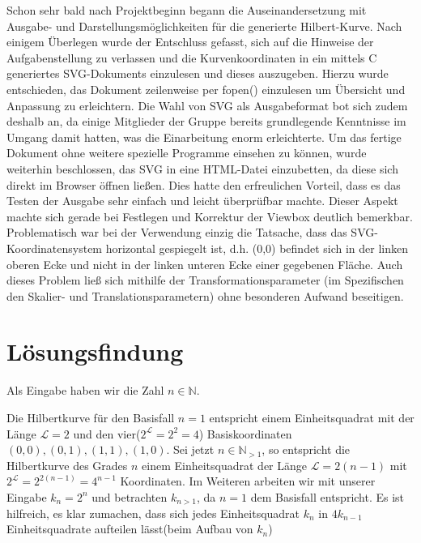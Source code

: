 \documentclass[course=erap]{aspdoc}
\begin{document}
Schon sehr bald nach Projektbeginn begann die Auseinandersetzung mit Ausgabe-
und Darstellungsmöglichkeiten für die generierte Hilbert-Kurve.
Nach einigem Überlegen wurde der Entschluss gefasst, sich auf die Hinweise der
Aufgabenstellung zu verlassen und die Kurvenkoordinaten in ein mittels C
generiertes SVG-Dokuments einzulesen und dieses auszugeben. Hierzu wurde
entschieden, das Dokument zeilenweise per fopen() einzulesen um Übersicht und
Anpassung zu erleichtern.
\newline
\newline
Die Wahl von SVG als Ausgabeformat bot sich zudem deshalb an, da einige
Mitglieder der Gruppe bereits grundlegende Kenntnisse im Umgang damit hatten,
was die Einarbeitung enorm erleichterte.
\newline
\newline
Um das fertige Dokument ohne weitere spezielle Programme einsehen zu können,
wurde weiterhin beschlossen, das SVG in eine HTML-Datei einzubetten, da diese
sich direkt im Browser öffnen ließen. 
Dies hatte den erfreulichen Vorteil, dass es das Testen der Ausgabe sehr
einfach und leicht überprüfbar machte. Dieser Aspekt machte sich gerade bei
Festlegen und Korrektur der Viewbox deutlich bemerkbar.
\newline
\newline
Problematisch war bei der Verwendung einzig die Tatsache, dass das
SVG-Koordinatensystem horizontal gespiegelt ist, d.h. (0,0) befindet sich in
der linken oberen Ecke und nicht in der linken unteren Ecke einer gegebenen
Fläche. Auch dieses Problem ließ sich mithilfe der Transformationsparameter (im
Spezifischen den Skalier- und Translationsparametern) ohne besonderen Aufwand
beseitigen.

\section{Lösungsfindung}
Als Eingabe haben wir die Zahl  $n\in\mathbb{N}$.

Die Hilbertkurve für den Basisfall $n=1$ entspricht einem Einheitsquadrat mit
der Länge ${\mathcal{L}}=2$ und den vier($2^{\mathcal{L}}=2^2=4$)
Basiskoordinaten $(0,0), (0,1), (1,1), (1,0)$.
Sei jetzt $n\in\mathbb{N}_{>1}$, so entspricht die Hilbertkurve des Grades $n$
einem Einheitsquadrat der Länge ${\mathcal{L}}=2(n-1)$ mit
$2^{\mathcal{L}}=2^{2(n-1)}=4^{n-1}$ Koordinaten.
Im Weiteren arbeiten wir mit unserer Eingabe $k_{n}=2^n$ und betrachten
$k_{n>1}$, da $n=1$ dem Basisfall entspricht.
Es ist hilfreich, es klar zumachen, dass sich jedes Einheitsquadrat $k_{n}$ in
$4k_{n-1}$ Einheitsquadrate aufteilen lässt(beim Aufbau von $k_{n}$)
\end{document}
